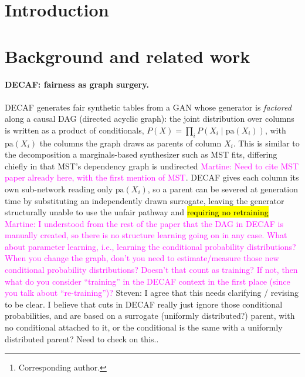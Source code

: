 \documentclass{article}
\title{\wkTitle}
\author{%
  Steven Golob\thanks{Corresponding author.} \\
  University of Washington Tacoma \\
  \texttt{golobs@uw.edu} \\
  \And
  Sikha Pentyala \\
  University of Washington Tacoma \\
  \And
  Martine De Cock \\
  University of Washington Tacoma \\
}
\newcommand{\martine}[1]{\textcolor{magenta}{Martine: #1}}
\newcommand{\s}[1]{\textcolor{Dandelion}{Steven: #1}}
\begin{document}
\maketitle

\begin{abstract}
\wkAbstract
\end{abstract}

\section{Introduction}
\wkIntro

\section{Background and related work}
\label{sec:related}

\paragraph{DECAF: fairness as graph surgery.}
DECAF \citep{vanbreugel2021decaf} generates fair synthetic tables from a GAN
whose generator is \emph{factored} along a causal DAG (directed acyclic
graph): the joint distribution over columns is written as a product of
conditionals, $P(X) = \prod_i P(X_i \mid \mathrm{pa}(X_i))$, with
$\mathrm{pa}(X_i)$ the columns the graph draws as parents of column $X_i$.
This is similar to the decomposition a marginals-based synthesizer such as
MST fits, differing chiefly in that MST's dependency graph is undirected \martine{Need to cite MST paper already here, with the first mention of MST}.
DECAF gives each column its own sub-network reading only $\mathrm{pa}(X_i)$,
so a parent can be severed at generation time by substituting an independently
drawn surrogate, leaving the generator structurally unable to use the unfair
pathway and \hl{requiring no retraining} \martine{I understood from the rest of the paper that the DAG in DECAF is manually created, so there is no structure learning going on in any case. What about parameter learning, i.e., learning the conditional probability distributions? When you change the graph, don't you need to estimate/measure those new conditional probability distributions? Doesn't that count as training? If not, then what do you consider ``training'' in the DECAF context in the first place (since you talk about ``re-training'')?} \s{I agree that this needs clarifying / revising to be clear. I believe that cuts in DECAF really just ignore those conditional probabilities, and are based on a surrogate (uniformly distributed?) parent, with no conditional attached to it, or the conditional is the same with a uniformly distributed parent? Need to check on this.}.
\end{document}
